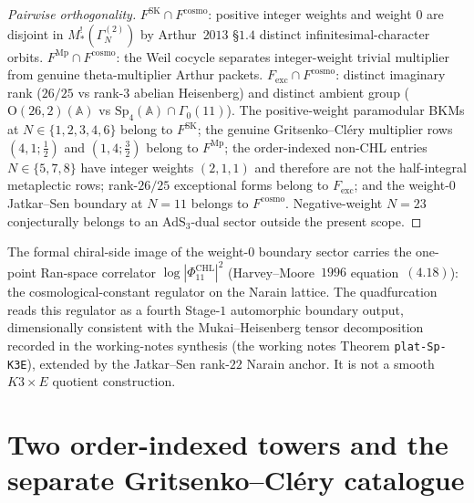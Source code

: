 \begin{proof}[Pairwise orthogonality]
$F^{\mathrm{SK}} \cap F^{\mathrm{cosmo}}$: positive integer weights and
weight $0$ are disjoint in $M^!_*(\Gamma^{(2)}_N)$ by Arthur~$2013$
\S$1.4$ distinct infinitesimal-character orbits.
$F^{\mathrm{Mp}} \cap F^{\mathrm{cosmo}}$: the Weil cocycle separates
integer-weight trivial multiplier from genuine theta-multiplier Arthur
packets. $F_{\mathrm{exc}} \cap F^{\mathrm{cosmo}}$: distinct imaginary
rank ($26/25$ vs rank-$3$ abelian Heisenberg) and distinct ambient group
($\mathrm{O}(26, 2)(\mathbb{A})$ vs
$\mathrm{Sp}_4(\mathbb{A}) \cap \Gamma_0(11)$). The positive-weight
paramodular BKMs at $N \in \{1,2,3,4,6\}$ belong to $F^{\mathrm{SK}}$;
the genuine Gritsenko--Cl\'ery multiplier rows
$(4,1;\tfrac12)$ and $(1,4;\tfrac32)$ belong to $F^{\mathrm{Mp}}$;
the order-indexed non-CHL entries $N\in\{5,7,8\}$ have integer weights
$(2,1,1)$ and therefore are not the half-integral metaplectic rows;
rank-$26/25$ exceptional forms belong to $F_{\mathrm{exc}}$; and the
weight-$0$ Jatkar--Sen boundary at $N=11$ belongs to
$F^{\mathrm{cosmo}}$. Negative-weight $N = 23$ conjecturally belongs
to an AdS$_3$-dual sector outside the present scope.
\end{proof}

\begin{remark}
\label{rem:k3e-cosmological-regulator}
The formal chiral-side image of the weight-$0$ boundary sector carries
the one-point Ran-space correlator $\log |\Phi^{\mathrm{CHL}}_{11}|^2$
(Harvey--Moore~$1996$ equation~$(4.18)$): the cosmological-constant
regulator on the Narain lattice. The quadfurcation reads this regulator
as a fourth Stage-$1$ automorphic boundary output, dimensionally
consistent with the Mukai--Heisenberg tensor decomposition recorded in
the working-notes synthesis (the working notes Theorem
\texttt{plat-Sp-K3E}), extended by the Jatkar--Sen rank-$22$ Narain
anchor. It is not a smooth $K3\times E$ quotient construction.
\end{remark}

\section{Two order-indexed towers and the separate Gritsenko--Cl\'ery catalogue}
\label{sec:k3e-two-tower-unification}


